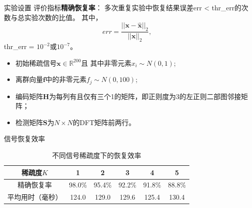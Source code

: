 \documentclass{ldr-simple-gray}
\begin{document}
\begin{frame}{实验设置}
    评价指标\textbf{精确恢复率}：
    多次重复实验中恢复结果误差err < thr\_err的次数与总实验次数的比值。
    其中，
    \begin{equation*}
        err=\frac{||{\mathbf{x} - \hat{\mathbf{x}}}||_2}{||\mathbf{x}||_2},
    \end{equation*}
    thr\_err = $10^{-2}$或$10^{-7}$。
    \begin{itemize}
        \item 初始稀疏信号$\mathbf{x} \in \mathbb{R}^{200}$且
        其中非零元素$x_i \sim N(0,1)$;
        \item 离群向量$\mathbf{f}$中的非零元素$f_j \sim N(0,100)$;
        \item 编码矩阵$\mathbf{H}$为每列有且仅有三个1的矩阵，即正则度为3的左正则二部图邻接矩阵；
        \item 检测矩阵$\mathbf{S}$为$N \times N$的DFT矩阵前两行。
    \end{itemize}
\end{frame}

\begin{frame}{信号恢复效率}
    \begin{table}[H]
        \centering
        \caption{不同测量次数下的恢复效率}
        \label{effeciency}
    \end{table}

    \begin{table}[H]
        \centering
        \caption{不同信号稀疏度下的恢复效率}
        \begin{tabular}{cccccc} %
            \toprule
            稀疏度$K$ & 1  & 2  & 3  & 4 & 5\\
            \toprule
            精确恢复率 & 98.0\% & 95.4\% & 92.2\%  & 91.8\% & 88.8\%\\
            \midrule
            平均用时（毫秒） & 124.0 & 129.0 & 129.6 &  125.4 & 130.4\\
            \bottomrule
        \end{tabular}
        \label{diff_sprs}
    \end{table}

\end{frame}
\end{document}
